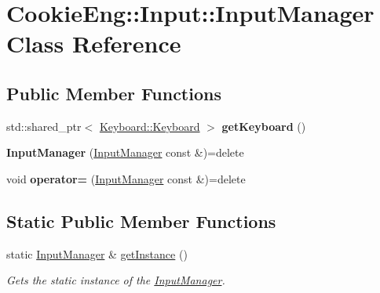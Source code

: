 \hypertarget{class_cookie_eng_1_1_input_1_1_input_manager}{}\section{Cookie\+Eng\+:\+:Input\+:\+:Input\+Manager Class Reference}
\label{class_cookie_eng_1_1_input_1_1_input_manager}
\subsection*{Public Member Functions}
\begin{DoxyCompactItemize}
\item 
\mbox{\label{class_cookie_eng_1_1_input_1_1_input_manager_afc8c29f4a07a98ea6599e5f421115361}} 
std\+::shared\+\_\+ptr$<$ \hyperlink{class_cookie_eng_1_1_input_1_1_keyboard_1_1_keyboard}{Keyboard\+::\+Keyboard} $>$ {\bfseries get\+Keyboard} ()
\item 
\mbox{\label{class_cookie_eng_1_1_input_1_1_input_manager_acd6ce668320f6c5b26e49dee84124ef3}} 
{\bfseries Input\+Manager} (\hyperlink{class_cookie_eng_1_1_input_1_1_input_manager}{Input\+Manager} const \&)=delete
\item 
\mbox{\label{class_cookie_eng_1_1_input_1_1_input_manager_abb6e65e5f51871ef3811ef0b709c5e5b}} 
void {\bfseries operator=} (\hyperlink{class_cookie_eng_1_1_input_1_1_input_manager}{Input\+Manager} const \&)=delete
\end{DoxyCompactItemize}
\subsection*{Static Public Member Functions}
\begin{DoxyCompactItemize}
\item 
static \hyperlink{class_cookie_eng_1_1_input_1_1_input_manager}{Input\+Manager} \& \hyperlink{class_cookie_eng_1_1_input_1_1_input_manager_a0ae972a3fda8747b2b9cc6bb9417dfa8}{get\+Instance} ()
\begin{DoxyCompactList}\small\item\em Gets the static instance of the \hyperlink{class_cookie_eng_1_1_input_1_1_input_manager}{Input\+Manager}. \end{DoxyCompactList}\end{DoxyCompactItemize}

